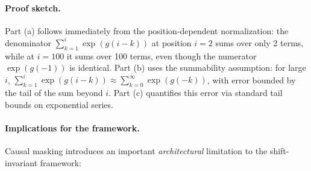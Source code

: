 \documentclass[11pt]{article}
\theoremstyle{definition}
\begin{document}
\paragraph{Proof sketch.}
Part (a) follows immediately from the position-dependent normalization: the denominator $\sum_{k=1}^i \exp(g(i-k))$ at position $i=2$ sums over only 2 terms, while at $i=100$ it sums over 100 terms, even though the numerator $\exp(g(-1))$ is identical. Part (b) uses the summability assumption: for large $i$, $\sum_{k=1}^i \exp(g(i-k)) \approx \sum_{k=0}^\infty \exp(g(-k))$, with error bounded by the tail of the sum beyond $i$. Part (c) quantifies this error via standard tail bounds on exponential series.

\paragraph{Implications for the framework.}
Causal masking introduces an important \emph{architectural} limitation to the shift-invariant framework:
\end{document}

